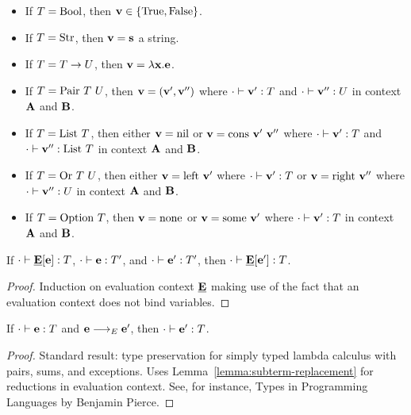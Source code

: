\begin{lemma}
\begin{itemize}
  \item If $T = \text{Bool}$, then $\textbf{v} \in \{ \text{True}, \text{False}\}$.
  \item If $T = \text{Str}$, then $\textbf{v} = \textbf{s}$ a string.
  \item If $T = T\to U$, then $\textbf{v} = \lambda
    \textbf{x}. \textbf{e}$. 
  \item If $\TYPE = \TPAIR\ \TYPE\ \TYPEU$, then $\textbf{v} = (\textbf{v}',
    \textbf{v}'')$ where $\cdot \vdash \textbf{v}' : T$ and $\cdot \vdash \textbf{v}'' : U$ in context $\textbf{A}$ and $\textbf{B}$.
  \item If $T = \text{List}\ T$, then either $\textbf{v} = \text{nil}$ or $\textbf{v}
    = \text{cons}\ {\textbf{v}'}\ {\textbf{v}''}$ where $\cdot \vdash \textbf{v}' : T$
    and $\cdot \vdash \textbf{v}'' : \text{List}\ T$ in context
    $\textbf{A}$ and $\textbf{B}$.
  \item If $\TYPE = \TSUM\ \TYPE\ \TYPEU$, then either $\textbf{v} = \text{left}\
    \textbf{v}'$ where $\cdot \vdash \textbf{v}' : T$ or $\textbf{v}= \text{right}\
    \textbf{v}''$ where $\cdot \vdash \textbf{v}'' : U$ in context
    $\textbf{A}$ and $\textbf{B}$.
  \item If $T = \text{Option}\ T$, then $\textbf{v} = \text{none}$ or $\textbf{v} =
    \text{some}\ \textbf{v}'$ where $\cdot \vdash \textbf{v}' : T$ in context
    $\textbf{A}$ and $\textbf{B}$.
  \end{itemize}
\end{lemma}

\begin{lemma}\label{lemma:subterm-replacement}
  If $\cdot \vdash  \underline{\textbf{E}}[\textbf{e}] : T$,
  $\cdot \vdash \textbf{e} : T'$, and
  $\cdot \vdash \textbf{e}' : T'$, then
  $\cdot \vdash  \underline{\textbf{E}}[\textbf{e}'] : T$.
\end{lemma}
\begin{proof}
  Induction on evaluation context $\underline{\textbf{E}}$ making use of the fact that
  an evaluation context does not bind variables.
\end{proof}

\begin{lemma}\label{lemma:type-preservation-expressions}
  If $\cdot \vdash  \textbf{e} : T$ and $\textbf{e} \stackrel{{}}\longrightarrow_E \textbf{e}'$,
  then  $\cdot \vdash  \textbf{e}' : T$.
\end{lemma}
\begin{proof}
  Standard result: type preservation for simply typed lambda calculus
  with pairs, sums, and exceptions. Uses
  Lemma~\ref{lemma:subterm-replacement} for reductions in evaluation
  context. See, for instance, Types in
  Programming Languages by Benjamin Pierce.
\end{proof}

